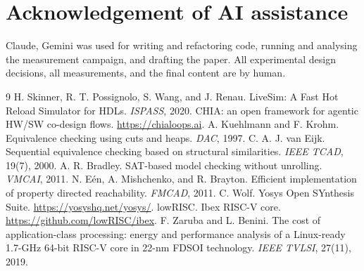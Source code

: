 \documentclass[sigconf,nonacm]{acmart}
\begin{document}
\section*{Acknowledgement of AI assistance}

Claude, Gemini was used for writing and refactoring code, running and analysing
the measurement campaign, and drafting the paper. All experimental design decisions, all measurements,
and the final content are by human.

\begin{thebibliography}{9}
\footnotesize
{} H. Skinner, R. T. Possignolo, S. Wang, and J. Renau.
LiveSim: A Fast Hot Reload Simulator for HDLs. \emph{ISPASS}, 2020.
 CHIA: an open framework for agentic HW/SW co-design flows.
\url{https://chialoops.ai}.
 A. Kuehlmann and F. Krohm. Equivalence checking using cuts
and heaps. \emph{DAC}, 1997.
 C. A. J. van Eijk. Sequential equivalence checking based on
structural similarities. \emph{IEEE TCAD}, 19(7), 2000.
 A. R. Bradley. SAT-based model checking without unrolling.
\emph{VMCAI}, 2011.
 N. E\'en, A. Mishchenko, and R. Brayton. Efficient implementation
of property directed reachability. \emph{FMCAD}, 2011.
 C. Wolf. Yosys Open SYnthesis Suite.
\url{https://yosyshq.net/yosys/}.
 lowRISC. Ibex RISC-V core. \url{https://github.com/lowRISC/ibex}.
 F. Zaruba and L. Benini. The cost of application-class
processing: energy and performance analysis of a Linux-ready 1.7-GHz 64-bit
RISC-V core in 22-nm FDSOI technology. \emph{IEEE TVLSI}, 27(11), 2019.
\end{thebibliography}

\balance
\end{document}
